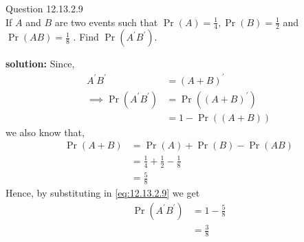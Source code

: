 \documentclass{article}
\begin{document}
\providecommand{\pr}[1]{\ensuremath{\Pr\left(#1\right)}}
\providecommand{\brak}[1]{\ensuremath{\left(#1\right)}}
\newcommand{\solution}{\noindent \textbf{solution: }}

Question 12.13.2.9\\
If $A$ and $B$ are two events such that $\pr{A} = \frac{1}{4}, \pr{B} = \frac{1}{2}$ and $\pr{AB} = \frac{1}{8}$ . Find $\pr{A^{\prime}B^{\prime}}.$

\solution
\fi
Since,
\begin{align}
	A^{\prime}B^{\prime} &= \brak{A+B}^{\prime} \\ \label{eq:12.13.2.9}
	\implies \pr{A^{\prime}B^{\prime}} &= \pr{\brak{A+B}^{\prime}} \\
	&= 1-\pr{\brak{A+B}}
\end{align}
we also know that,
\begin{align}
	\pr{A+B} &= \pr{A} + \pr{B} - \pr{AB} \\
	&= \frac{1}{4} +\frac{1}{2} - \frac{1}{8} \\
	&= \frac{5}{8}
\end{align}
Hence, by substituting in \eqref{eq:12.13.2.9} we get
\begin{align}
	\pr{A^{\prime}B^{\prime}} &= 1 - \frac{5}{8} \\
	&= \frac{3}{8}
\end{align}
\end{document}
